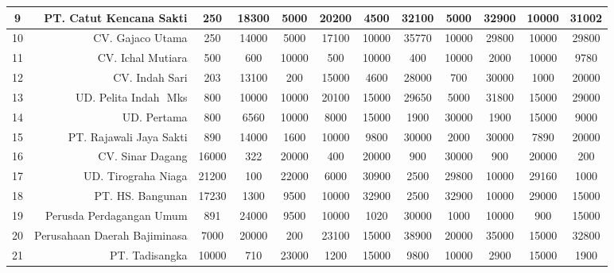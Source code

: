 \documentclass{article}
\begin{document}
\begin{table}[h]
\begin{tabular}{|c|r|c|c|c|c|c|c|c|c|c|c|}
		\hline
		9 & PT. Catut Kencana Sakti &        250 &      18300 &       5000 &      20200 &       4500 &      32100 &       5000 &      32900 &      10000 &      31002 \\
		\hline
		10 & CV. Gajaco Utama &        250 &      14000 &       5000 &      17100 &      10000 &      35770 &      10000 &      29800 &      10000 &      29800 \\
		\hline
		11 & CV. Ichal Mutiara &        500 &        600 &      10000 &        500 &      10000 &        400 &      10000 &       2000 &      10000 &       9780 \\
		\hline
		12 & CV. Indah Sari &        203 &      13100 &        200 &      15000 &       4600 &      28000 &        700 &      30000 &       1000 &      20000 \\
		\hline
		13 & UD. Pelita Indah  Mks &        800 &      10000 &      10000 &      20100 &      15000 &      29650 &       5000 &      31800 &      15000 &      29000 \\
		\hline
		14 & UD. Pertama &        800 &       6560 &      10000 &       8000 &      15000 &       1900 &      30000 &       1900 &      15000 &       9000 \\
		\hline
		15 & PT. Rajawali Jaya Sakti &        890 &      14000 &       1600 &      10000 &       9800 &      30000 &       2000 &      30000 &       7890 &      20000 \\
		\hline
		16 & CV. Sinar Dagang &      16000 &        322 &      20000 &        400 &      20000 &        900 &      30000 &        900 &      20000 &        200 \\
		\hline
		17 & UD. Tirograha Niaga &      21200 &        100 &      22000 &       6000 &      30900 &       2500 &      29800 &      10000 &      29160 &       1000 \\
		\hline
		18 & PT. HS. Bangunan &      17230 &       1300 &       9500 &      10000 &      32900 &       2500 &      32900 &      10000 &      29000 &      15000 \\
		\hline
		19 & Perusda Perdagangan Umum &        891 &      24000 &       9500 &      10000 &       1020 &      30000 &       1000 &      10000 &        900 &      15000 \\
		\hline
		20 & Perusahaan Daerah Bajiminasa &       7000 &      20000 &        200 &      23100 &      15000 &      38900 &      20000 &      35000 &      15000 &      32800 \\
		\hline
		21 & PT. Tadisangka &      10000 &        710 &      23000 &       1200 &      15000 &       9800 &      10000 &       2900 &      15000 &       1900 \\

\end{tabular}
\end{table}
\end{document}
